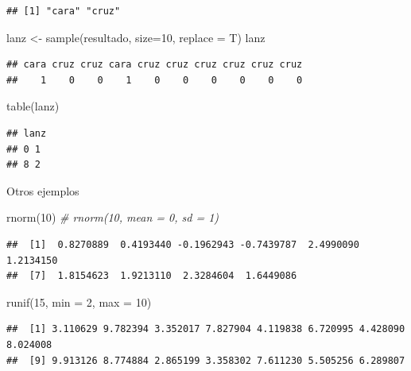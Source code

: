 \documentclass[
]{book}
\newenvironment{Shaded}{\begin{snugshade}}{\end{snugshade}}
\newcommand{\AttributeTok}[1]{\textcolor[rgb]{0.77,0.63,0.00}{#1}}
\newcommand{\CommentTok}[1]{\textcolor[rgb]{0.56,0.35,0.01}{\textit{#1}}}
\newcommand{\DecValTok}[1]{\textcolor[rgb]{0.00,0.00,0.81}{#1}}
\newcommand{\FunctionTok}[1]{\textcolor[rgb]{0.00,0.00,0.00}{#1}}
\newcommand{\NormalTok}[1]{#1}
\newcommand{\OtherTok}[1]{\textcolor[rgb]{0.56,0.35,0.01}{#1}}
\theoremstyle{break}
\begin{document}
\begin{verbatim}
## [1] "cara" "cruz"
\end{verbatim}

\begin{Shaded}
\begin{Highlighting}[]
\NormalTok{lanz }\OtherTok{\textless{}{-}} \FunctionTok{sample}\NormalTok{(resultado, }\AttributeTok{size=}\DecValTok{10}\NormalTok{, }\AttributeTok{replace =}\NormalTok{ T)}
\NormalTok{lanz}
\end{Highlighting}
\end{Shaded}

\begin{verbatim}
## cara cruz cruz cara cruz cruz cruz cruz cruz cruz 
##    1    0    0    1    0    0    0    0    0    0
\end{verbatim}

\begin{Shaded}
\begin{Highlighting}[]
\FunctionTok{table}\NormalTok{(lanz)}
\end{Highlighting}
\end{Shaded}

\begin{verbatim}
## lanz
## 0 1 
## 8 2
\end{verbatim}

Otros ejemplos

\begin{Shaded}
\begin{Highlighting}[]
\FunctionTok{rnorm}\NormalTok{(}\DecValTok{10}\NormalTok{)  }\CommentTok{\# rnorm(10, mean = 0, sd = 1)}
\end{Highlighting}
\end{Shaded}

\begin{verbatim}
##  [1]  0.8270889  0.4193440 -0.1962943 -0.7439787  2.4990090  1.2134150
##  [7]  1.8154623  1.9213110  2.3284604  1.6449086
\end{verbatim}

\begin{Shaded}
\begin{Highlighting}[]
\FunctionTok{runif}\NormalTok{(}\DecValTok{15}\NormalTok{, }\AttributeTok{min =} \DecValTok{2}\NormalTok{, }\AttributeTok{max =} \DecValTok{10}\NormalTok{)}
\end{Highlighting}
\end{Shaded}

\begin{verbatim}
##  [1] 3.110629 9.782394 3.352017 7.827904 4.119838 6.720995 4.428090 8.024008
##  [9] 9.913126 8.774884 2.865199 3.358302 7.611230 5.505256 6.289807
\end{verbatim}
\end{document}
